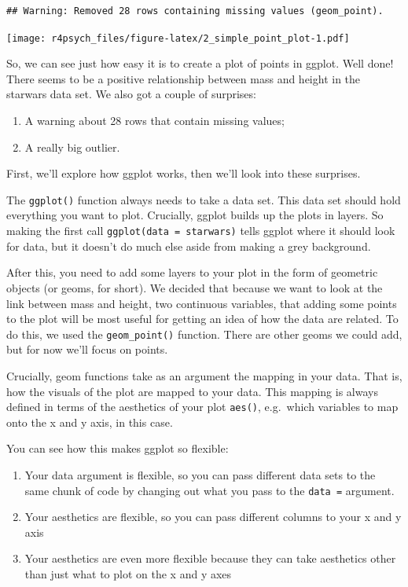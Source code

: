 \documentclass[
]{book}
\providecommand{\tightlist}{%
  \setlength{\itemsep}{0pt}\setlength{\parskip}{0pt}}
\begin{document}
\begin{verbatim}
## Warning: Removed 28 rows containing missing values (geom_point).
\end{verbatim}

\texttt{[image: r4psych\_files/figure-latex/2\_simple\_point\_plot-1.pdf]}

So, we can see just how easy it is to create a plot of points in ggplot. Well done! There seems to be a positive relationship between mass and height in the starwars data set. We also got a couple of surprises:

\begin{enumerate}
\def\labelenumi{\arabic{enumi}.}
\tightlist
\item
  A warning about 28 rows that contain missing values;
\item
  A really big outlier.
\end{enumerate}

First, we'll explore how ggplot works, then we'll look into these surprises.

The \texttt{ggplot()} function always needs to take a data set. This data set should hold everything you want to plot. Crucially, ggplot builds up the plots in layers. So making the first call \texttt{ggplot(data\ =\ starwars)} tells ggplot where it should look for data, but it doesn't do much else aside from making a grey background.

After this, you need to add some layers to your plot in the form of geometric objects (or geoms, for short). We decided that because we want to look at the link between mass and height, two continuous variables, that adding some points to the plot will be most useful for getting an idea of how the data are related. To do this, we used the \texttt{geom\_point()} function. There are other geoms we could add, but for now we'll focus on points.

Crucially, geom functions take as an argument the mapping in your data. That is, how the visuals of the plot are mapped to your data. This mapping is always defined in terms of the aesthetics of your plot \texttt{aes()}, e.g.~which variables to map onto the x and y axis, in this case.

You can see how this makes ggplot so flexible:

\begin{enumerate}
\def\labelenumi{\arabic{enumi}.}
\tightlist
\item
  Your data argument is flexible, so you can pass different data sets to the same chunk of code by changing out what you pass to the \texttt{data\ =} argument.
\item
  Your aesthetics are flexible, so you can pass different columns to your x and y axis
\item
  Your aesthetics are even more flexible because they can take aesthetics other than just what to plot on the x and y axes
\end{enumerate}
\end{document}
